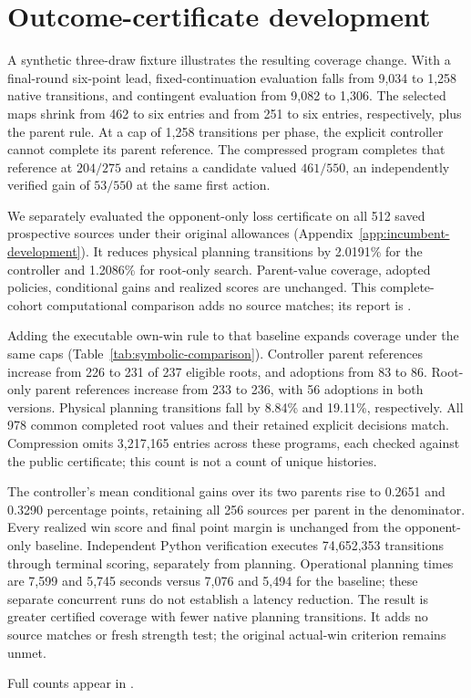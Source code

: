 \section{Outcome-certificate development}\label{app:symbolic-development}
A synthetic three-draw fixture illustrates the resulting coverage change.
With a final-round six-point lead, fixed-continuation evaluation falls from
9,034 to 1,258 native transitions, and contingent evaluation from 9,082 to 1,306.
The selected maps shrink from 462 to six entries and from 251 to six entries,
respectively, plus the parent rule. At a cap of 1,258 transitions per phase,
the explicit controller cannot complete its parent reference. The compressed
program completes that reference at $204/275$ and retains a candidate valued
$461/550$, an independently verified gain of $53/550$ at the same first action.

We separately evaluated the opponent-only loss certificate on all 512 saved
prospective sources under their original allowances
(Appendix~\ref{app:incumbent-development}). It reduces physical
planning transitions by 2.0191\% for the controller and 1.2086\% for root-only
search. Parent-value coverage, adopted policies, conditional gains and realized
scores are unchanged. This complete-cohort computational comparison adds no
source matches; its report is .

Adding the executable own-win rule to that baseline expands coverage under
the same caps (Table~\ref{tab:symbolic-comparison}). Controller parent references
increase from 226 to 231 of 237 eligible roots, and adoptions from 83 to 86.
Root-only parent references increase from 233 to 236, with 56 adoptions in both
versions. Physical planning transitions fall by 8.84\% and 19.11\%, respectively.
All 978 common completed root values and their retained explicit decisions
match. Compression omits 3,217,165 entries across these programs, each checked
against the public certificate; this count is not a count of unique histories.



The controller's mean conditional gains over its two parents rise to 0.2651 and
0.3290 percentage points, retaining all 256 sources per parent in the denominator.
Every realized win score and final point margin is unchanged from the
opponent-only baseline. Independent Python verification executes 74,652,353
transitions through terminal scoring, separately from planning. Operational
planning times are 7,599 and 5,745 seconds versus 7,076 and 5,494 for the baseline;
these separate concurrent runs do not establish a latency reduction. The result
is greater certified coverage with fewer native planning transitions. It adds
no source matches or fresh strength test; the original actual-win criterion
remains unmet.

Full counts appear in
.

